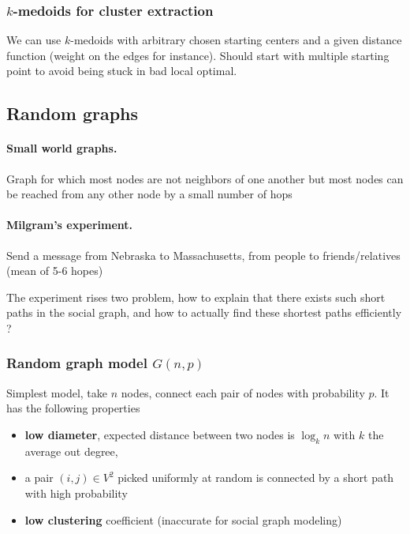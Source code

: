 \subsubsection{$k$-medoids for cluster extraction}

We can use $k$-medoids with arbitrary chosen starting centers and a given distance function (weight on the edges for instance). Should start with multiple starting point to avoid being stuck in bad local optimal.

\subsection{Random graphs}

\paragraph{Small world graphs.}
  Graph for which most nodes are not neighbors of one another but most nodes can be reached from any other node by a small number of hops


\paragraph{Milgram's experiment.} Send a message from Nebraska to Massachusetts, from people to friends/relatives (mean of 5-6 hopes)

The experiment rises two problem, how to explain that there exists such short paths in  the social graph, and how to actually find these shortest paths efficiently ?

\subsubsection{Random graph model $G(n,p)$}

Simplest model, take $n$ nodes, connect each pair of nodes with probability $p$. It has the following properties

\begin{itemize}
  \item \textbf{low diameter}, expected distance between two nodes is $\log_k n$ with $k$ the average out degree,
  \item a pair $(i,j) \in V^2$ picked uniformly at random is connected by a short path with high probability
  \item \textbf{low clustering} coefficient (inaccurate for social graph modeling)
\end{itemize}

